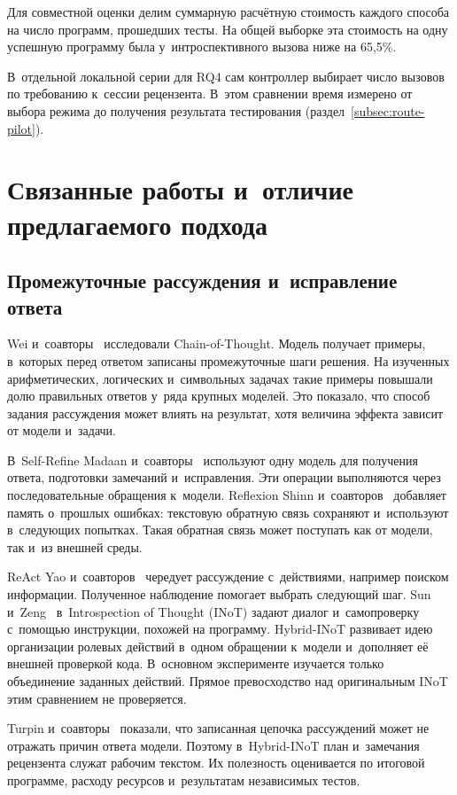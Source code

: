 Для совместной оценки делим суммарную расчётную стоимость каждого способа на число программ, прошедших тесты. На общей выборке эта стоимость на одну успешную программу была у~интроспективного вызова ниже на 65,5\%.

В~отдельной локальной серии для RQ4 сам контроллер выбирает число вызовов по требованию к~сессии рецензента. В~этом сравнении время измерено от выбора режима до получения результата тестирования (раздел~\ref{subsec:route-pilot}).

\section{Связанные работы и~отличие предлагаемого подхода}\label{sec:related}
\subsection{Промежуточные рассуждения и~исправление ответа}
Wei и~соавторы~\cite{wei2022cot} исследовали Chain-of-Thought. Модель получает примеры, в~которых перед ответом записаны промежуточные шаги решения. На изученных арифметических, логических и~символьных задачах такие примеры повышали долю правильных ответов у~ряда крупных моделей. Это показало, что способ задания рассуждения может влиять на результат, хотя величина эффекта зависит от модели и~задачи.

В~Self-Refine Madaan и~соавторы~\cite{madaan2023selfrefine} используют одну модель для получения ответа, подготовки замечаний и~исправления. Эти операции выполняются через последовательные обращения к~модели. Reflexion Shinn и~соавторов~\cite{shinn2023reflexion} добавляет память о~прошлых ошибках: текстовую обратную связь сохраняют и~используют в~следующих попытках. Такая обратная связь может поступать как от модели, так и~из внешней среды.

ReAct Yao и~соавторов~\cite{yao2022react} чередует рассуждение с~действиями, например поиском информации. Полученное наблюдение помогает выбрать следующий шаг. Sun и~Zeng~\cite{sun2025inot} в~Introspection of Thought (INoT) задают диалог и~самопроверку с~помощью инструкции, похожей на программу. Hybrid-INoT развивает идею организации ролевых действий в~одном обращении к~модели и~дополняет её внешней проверкой кода. В~основном эксперименте изучается только объединение заданных действий. Прямое превосходство над оригинальным INoT этим сравнением не проверяется.

Turpin и~соавторы~\cite{turpin2023unfaithful} показали, что записанная цепочка рассуждений может не отражать причин ответа модели. Поэтому в~Hybrid-INoT план и~замечания рецензента служат рабочим текстом. Их полезность оценивается по итоговой программе, расходу ресурсов и~результатам независимых тестов.

